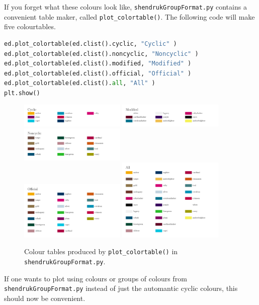 \documentclass[10pt,a4paper]{article}
\begin{document}
If you forget what these colours look like, \texttt{shendrukGroupFormat.py} contains a convenient table maker, called \texttt{plot\_colortable()}. 
The following code will make five colourtables. 
\begin{lstlisting}[language=Python]
ed.plot_colortable(ed.clist().cyclic, "Cyclic" )
ed.plot_colortable(ed.clist().noncyclic, "Noncyclic" )
ed.plot_colortable(ed.clist().modified, "Modified" )
ed.plot_colortable(ed.clist().official, "Official" )
ed.plot_colortable(ed.clist().all, "All" )
plt.show()
\end{lstlisting}
\begin{figure}[h]
  \centering
  \includegraphics[width=0.45\textwidth]{tableCyclic.pdf}
  \includegraphics[width=0.45\textwidth]{tableModified.pdf}\\
  \includegraphics[width=0.45\textwidth]{tableNoncyclic.pdf}\\
  \includegraphics[width=0.45\textwidth]{tableOfficial.pdf}
  \includegraphics[width=0.45\textwidth]{tableAll.pdf}
  \caption{Colour tables produced by \texttt{plot\_colortable()} in \texttt{shendrukGroupFormat.py}.}
\end{figure}
If one wants to plot using colours or groups of colours from \texttt{shendrukGroupFormat.py} instead of just the automantic cyclic colours, this should now be convenient. 
\end{document}
